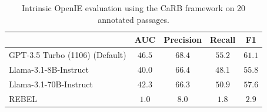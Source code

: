 \documentclass{article}
\begin{document}
\begin{appendices}
\begin{table}[!h]
\small
  \caption{Intrinsic OpenIE evaluation using the CaRB \cite{bhardwaj-etal-2019-carb} framework on 20 annotated passages.}
  \label{tab:intrinsic_openie_results}
  \centering
\begin{tabular}{@{}lcccc@{}}
\toprule
& \textbf{AUC} & \textbf{Precision} & \textbf{Recall} & \textbf{F1}\\ \midrule
GPT-3.5 Turbo (1106) \cite{openai_gpt_3_5_turbo} (Default) & $46.5$ & $68.4$ & $55.2$ & $61.1$ \\
Llama-3.1-8B-Instruct \cite{llama3modelcard} & $40.0$ & $66.4$ & $48.1$ & $55.8$ \\
Llama-3.1-70B-Instruct \cite{llama3modelcard} & $42.3$ & $66.3$ & $50.9$ & $57.6$ \\
REBEL \cite{rebel} & $1.0$ & $8.0$ & $1.8$ & $2.9$ \\
 \bottomrule
\end{tabular}
\end{table}




\end{appendices}
\end{document}
